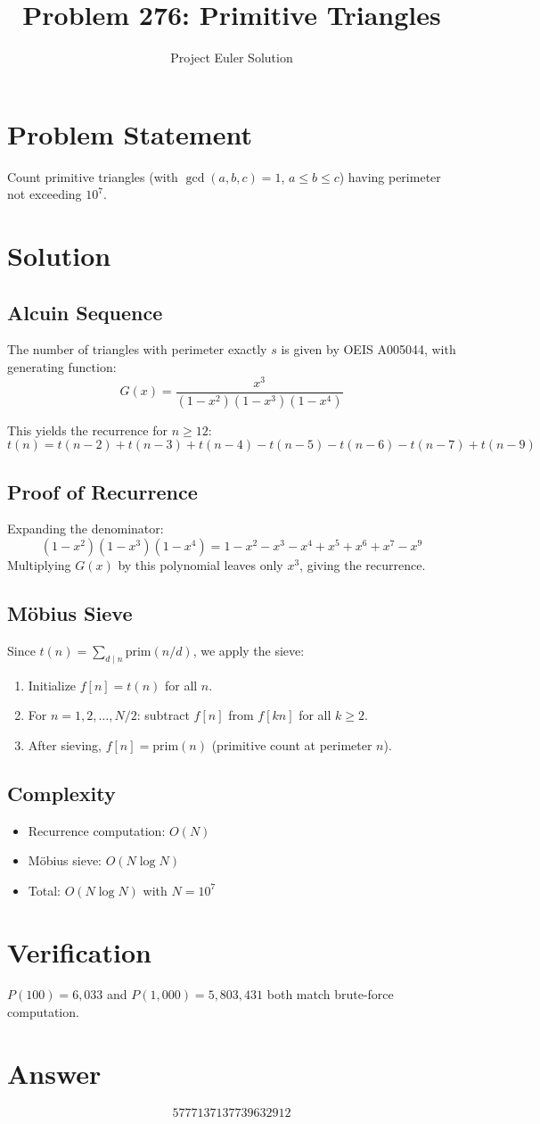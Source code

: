 \documentclass[12pt]{article}
\title{Problem 276: Primitive Triangles}
\author{Project Euler Solution}
\date{}
\begin{document}
\maketitle

\section{Problem Statement}
Count primitive triangles (with $\gcd(a,b,c)=1$, $a \le b \le c$) having perimeter not exceeding $10^7$.

\section{Solution}

\subsection{Alcuin Sequence}
The number of triangles with perimeter exactly $s$ is given by OEIS A005044, with generating function:
\[
G(x) = \frac{x^3}{(1-x^2)(1-x^3)(1-x^4)}
\]

This yields the recurrence for $n \ge 12$:
\[
t(n) = t(n{-}2) + t(n{-}3) + t(n{-}4) - t(n{-}5) - t(n{-}6) - t(n{-}7) + t(n{-}9)
\]

\subsection{Proof of Recurrence}
Expanding the denominator:
\[
(1-x^2)(1-x^3)(1-x^4) = 1 - x^2 - x^3 - x^4 + x^5 + x^6 + x^7 - x^9
\]
Multiplying $G(x)$ by this polynomial leaves only $x^3$, giving the recurrence.

\subsection{M\"obius Sieve}
Since $t(n) = \sum_{d \mid n} \mathrm{prim}(n/d)$, we apply the sieve:
\begin{enumerate}
    \item Initialize $f[n] = t(n)$ for all $n$.
    \item For $n = 1, 2, \ldots, N/2$: subtract $f[n]$ from $f[kn]$ for all $k \ge 2$.
    \item After sieving, $f[n] = \mathrm{prim}(n)$ (primitive count at perimeter $n$).
\end{enumerate}

\subsection{Complexity}
\begin{itemize}
    \item Recurrence computation: $O(N)$
    \item M\"obius sieve: $O(N \log N)$
    \item Total: $O(N \log N)$ with $N = 10^7$
\end{itemize}

\section{Verification}
$P(100) = 6{,}033$ and $P(1{,}000) = 5{,}803{,}431$ both match brute-force computation.

\section{Answer}

\[
\boxed{5777137137739632912}
\]
\end{document}
